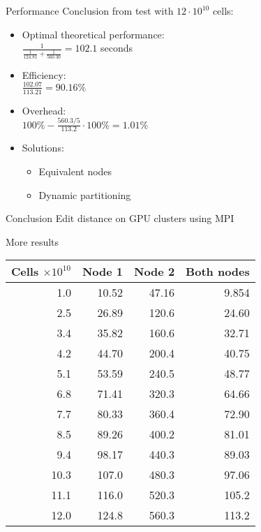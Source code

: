 \begin{frame}
    
\end{frame}
\begin{frame}
    
\end{frame}

\begin{frame}{Performance}
	Conclusion from test with $12\cdot10^{10}$ cells:
	\begin{itemize}
		\item Optimal theoretical performance: \\
			  $\frac{1}{ \frac{1}{124.81} + \frac{1}{560.30} }=102.1$ seconds
		\item Efficiency: \\
			  $\frac{102.07}{113.21}=90.16\%$
		\item Overhead: \\
			  $100\% - \frac{560.3/5}{113.2} \cdot 100\%=1.01\%$
		\item Solutions:
		\begin{itemize}
			\item Equivalent nodes
			\item Dynamic partitioning
		\end{itemize}
	\end{itemize}
\end{frame}

\begin{frame}{Conclusion}
Edit distance on GPU clusters using MPI
\end{frame}

\backupbegin
{}

\begin{frame}
	
	\hspace{1em}
	
\end{frame}

\begin{frame}{More results}
	\begin{tabular}{r|r|r|r}
		Cells $\times10^{10}$ & Node 1 & Node 2 & Both nodes \\ \hline
		1.0 & 10.52 & 47.16 & 9.854 \\
		2.5 & 26.89 & 120.6 & 24.60 \\
		3.4 & 35.82 & 160.6 & 32.71 \\
		4.2 & 44.70 & 200.4 & 40.75 \\
		5.1 & 53.59 & 240.5 & 48.77 \\
		6.8 & 71.41 & 320.3 & 64.66 \\
		7.7 & 80.33 & 360.4 & 72.90 \\
		8.5 & 89.26 & 400.2 & 81.01 \\
		9.4 & 98.17 & 440.3 & 89.03 \\
		10.3 & 107.0 & 480.3 & 97.06 \\
		11.1 & 116.0 & 520.3 & 105.2 \\
		12.0 & 124.8 & 560.3 & 113.2 \\
	\end{tabular}
\end{frame}

